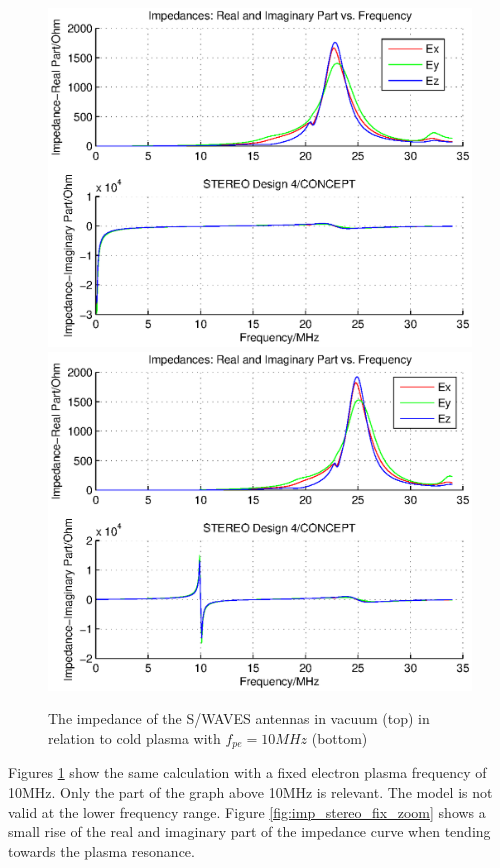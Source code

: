 \documentclass[a4paper,11pt]{thesis}
\begin{document}
\begin{figure}
\begin{center}
  \includegraphics[width=11.5cm]{DissPics/impedance_stereo_vac.eps}
\includegraphics[width=11.5cm]{DissPics/impedance_stereo_pl_fix.eps}
  \caption{The impedance of the S/WAVES antennas in vacuum (top) in relation to cold plasma with $f_{pe}=10MHz$ (bottom)}\label{fig:imp_stereo_fix}
  \end{center}
\end{figure}

Figures \ref{fig:imp_stereo_fix} show the same calculation with a fixed electron plasma frequency of 10MHz. Only the part of the graph above 10MHz is relevant. The model is not valid at the lower frequency range. Figure \ref{fig:imp_stereo_fix_zoom} shows a small rise of the real and imaginary part of the impedance curve when tending towards the plasma resonance.
\end{document}
